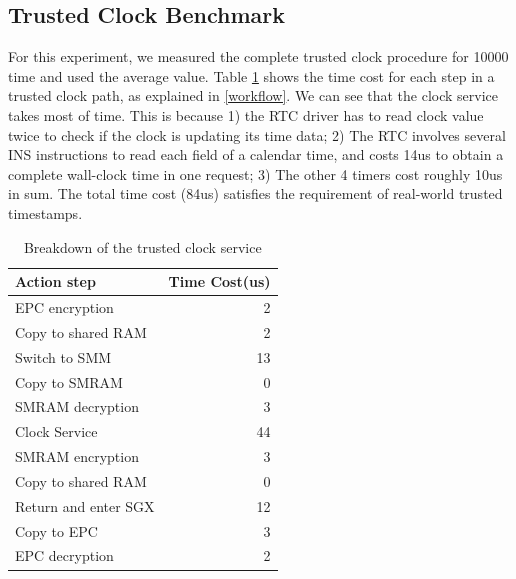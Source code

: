 \subsection{Trusted Clock Benchmark}\label{time_bench}
For this experiment, we measured the complete trusted clock procedure for 10000 time and used the average value. Table \ref{table:breaktime} shows the time cost for each step in a trusted clock path, as explained in \autoref{workflow}. We can see that the clock service takes most of time. This is because 1) the RTC driver has to read clock value twice to check if the clock is updating its time data; 2) The RTC involves several \textsf{INS} instructions to read each field of a calendar time, and costs 14us to obtain a complete wall-clock time in one request; 3) The other 4 timers cost roughly 10us in sum. The total  time cost (84us) satisfies the requirement of real-world trusted timestamps.
\begin{table}[t]
	\centering
	\caption{ Breakdown of the trusted clock service}
	\small
	\label{table:breaktime}
	\begin{tabular}{lr}
		\toprule
		Action step & Time Cost(us) \\
		\midrule
		EPC encryption & 2\\
		Copy to shared RAM & 2\\
		Switch to SMM & 13\\
		Copy to SMRAM & 0\\
		SMRAM decryption & 3\\
		Clock Service & 44\\
		SMRAM encryption & 3\\
		Copy to shared RAM & 0\\
		Return and enter SGX & 12\\
		Copy to EPC & 3\\
		EPC decryption & 2\\
		\bottomrule
	\end{tabular}
\end{table}
